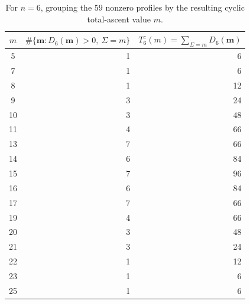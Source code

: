 \documentclass[11pt,a4paper]{amsart}
\newtheorem{remark}[theorem]{Remark}
\newcommand{\1}{\mathbf{1}}
\begin{document}
\begin{table}[htbp]\centering
\caption{For \(n=6\), grouping the \(59\) nonzero profiles by the resulting
cyclic total-ascent value \(m\).}
\label{tab:D6-grouped}
\begin{tabular}{c|r|r}
\(m\) & \(\#\{\mathbf m:D_6(\mathbf m)>0,\ \Sigma=m\}\)
& \(T_6^c(m)=\sum_{\Sigma=m}D_6(\mathbf m)\)\\ \hline
5 & 1 & 6\\
7 & 1 & 6\\
8 & 1 & 12\\
9 & 3 & 24\\
10 & 3 & 48\\
11 & 4 & 66\\
13 & 7 & 66\\
14 & 6 & 84\\
15 & 7 & 96\\
16 & 6 & 84\\
17 & 7 & 66\\
19 & 4 & 66\\
20 & 3 & 48\\
21 & 3 & 24\\
22 & 1 & 12\\
23 & 1 & 6\\
25 & 1 & 6\\
\end{tabular}
\end{table}
%
\end{document}
